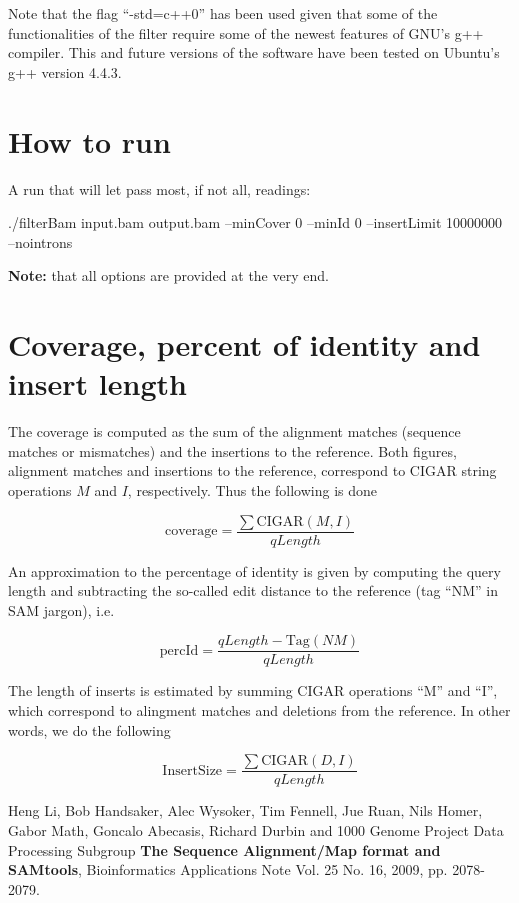 \documentclass[11pt]{article}
\begin{document}
Note that the flag ``-std=c++0'' has been used given that some of the functionalities of the filter require 
some of the newest features of GNU's g++ compiler. This and future versions of the software have been tested 
on Ubuntu's g++ version 4.4.3.

\section{How to run}
A run that will let pass most, if not all, readings: 
\begin{flushleft}
./filterBam input.bam output.bam --minCover 0 --minId 0  --insertLimit 10000000 --nointrons
\end{flushleft}
\textbf{Note:} that all options are provided at the very end.

\section{Coverage, percent of identity and insert length}
The coverage is computed as the sum of the alignment matches (sequence matches or mismatches) and 
the insertions to the reference. Both figures, alignment matches and insertions to the reference, correspond 
to CIGAR string operations $M$ and $I$, respectively. Thus the following is done 

\begin{equation}
	\mathrm{coverage} = \frac{\sum\mathrm{CIGAR}\left(M,I\right)}{qLength}
\end{equation}

An approximation to the percentage of identity is given by computing the query length and subtracting the 
so-called edit distance to the reference (tag ``NM'' in SAM jargon), i.e.

\begin{equation}
	\mathrm{percId} = \frac{qLength - \mathrm{Tag}(NM)}{qLength}
\end{equation}

The length of inserts is estimated by summing CIGAR operations ``M'' and ``I'', which correspond to alingment 
matches and deletions from the reference. In other words, we do the following

\begin{equation}
	\mathrm{InsertSize} = \frac{\sum\mathrm{CIGAR}\left(D,I\right)}{qLength}
\end{equation}


\begin{thebibliography}{99}
 Heng Li, Bob Handsaker, Alec Wysoker, Tim Fennell, Jue Ruan, Nils Homer, Gabor Math, 
Goncalo Abecasis, Richard Durbin and 1000 Genome Project Data Processing Subgroup 
{\bf The Sequence Alignment/Map format and SAMtools}, 
Bioinformatics Applications Note Vol. 25 No. 16, 2009, pp. 2078-2079.
\end{thebibliography}


\end{document}
